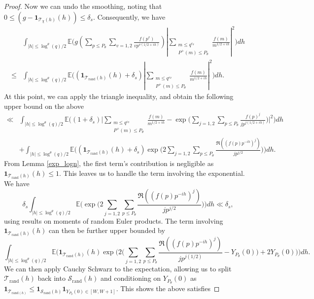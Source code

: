 \documentclass[10pt,a4paper]{amsart}
\numberwithin{equation}{section}
\begin{document}
\begin{proof}
    Now we can undo the smoothing, noting that $0 \leq (g - \mathbf{1}_{\mathcal{T}_\chi(h)}(h)) \leq \delta_s$. Consequently, we have
    \begin{align*}
        &\int_{|h| \leq \log^{\theta}(q)/2}\mathbb{E}\big(g(\sum_{p \leq P_\theta}\sum_{v=1,2}\frac{f(p^v)}{vp^{v(1/2+ih)}})|\sum_{\substack{m \leq q^{\varepsilon_\theta} \\ P^+(m) \leq P_\theta}}\frac{f(m)}{m^{1/2+ih}}|^2\big)dh \\
        \leq& \int_{|h| \leq \log^{\theta}(q)/2}\mathbb{E}\big((\mathbf{1}_{\mathcal{T}_{\text{rand}}(h)}(h)+\delta_s)|\sum_{\substack{m \leq q^{\varepsilon_\theta} \\ P^+(m) \leq P_\theta}}\frac{f(m)}{m^{1/2+ih}}|^2\big)dh.
    \end{align*}
    At this point, we can apply the triangle inequality, and obtain the following upper bound on the above
    \begin{align*}
        \ll& \int_{|h| \leq \log^\theta(q)/2}\mathbb{E}\big((1+\delta_s)\big|\sum_{\substack{m \leq q^{\varepsilon_\theta} \\ P^+(m) \leq P_\theta}}\frac{f(m)}{m^{1/2+ih}}-\exp\bigg(\sum_{j=1,2}\sum_{p \leq P_\theta}\frac{f(p)^j}{jp^{j(1/2+ih)}}\bigg)\big|^2\big)dh \\
        &+\int_{|h| \leq \log^\theta(q)/2}\mathbb{E}\big((\mathbf{1}_{\mathcal{T}_{\text{rand}}(h)}(h)+\delta_s)\exp\big(2\sum_{j=1,2}\sum_{p \leq P_\theta}\frac{\Re((f(p)p^{-ih})^j)}{jp^{j/2}}\big)\big)dh.
    \end{align*}
    From Lemma \ref{exp_logn}, the first term's contribution is negligible as $\mathbf{1}_{\mathcal{T}_{\text{rand}}(h)}(h) \leq 1$. This leaves us to handle the term involving the exponential. We have $$\delta_s\int_{|h| \leq \log^\theta(q)/2}\mathbb{E}\big(\exp\big(2\sum_{j=1,2}\sum_{p \leq P_\theta}\frac{\Re((f(p)p^{-ih})^j)}{jp^{j/2}}\big)\big)dh\ll \delta_s,$$ using results on moments of random Euler products. The term involving $\mathbf{1}_{\mathcal{T}_{\text{rand}}(h)}(h)$ can then be further upper bounded by
    \begin{equation}
        \int_{|h| \leq \log^\theta(q)/2}\mathbb{E}\big(\mathbf{1}_{\mathcal{T}_{\text{rand}}(h)}(h)\exp\big(2\big(\sum_{j=1,2}\sum_{p \leq P_\theta}\frac{\Re((f(p)p^{-ih})^j)}{jp^{j(1/2)}}-Y_{P_\theta}(0)\big) + 2Y_{P_\theta}(0)\big)\big)dh. \label{final_form}
    \end{equation}
    We can then apply Cauchy Schwarz to the expectation, allowing us to split $\mathcal{T}_{\text{rand}}(h)$ back into $\mathcal{S}_{\text{rand}}(h)$ and conditioning on $Y_{P_\theta}(0)$ as $\mathbf{1}_{\mathcal{T}_{\text{rand}(h)}} \leq \mathbf{1}_{\mathcal{S}_{\text{rand}}(h)}\mathbf{1}_{Y_{P_\theta}(0) \in [W,W+1]}$. This shows the above satisfies

\end{proof}
\end{document}
